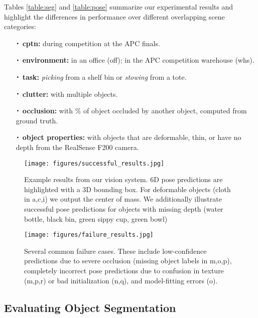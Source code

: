 \documentclass[letterpaper, 10 pt, conference]{ieeeconf}  %
\newcommand*{\Cdot}{\raisebox{-0.25ex}{\scalebox{1.75}{$\cdot$}}}
\begin{document}
Tables \ref{table:seg} and \ref{table:pose} summarize our experimental results and highlight the differences in performance over different overlapping scene categories:
\begin{itemize}
\item[$\Cdot$] \textbf{cptn:} during competition at the APC finals.
\item[$\Cdot$] \textbf{environment:} in an office (off); in the APC competition warehouse (whs).
\item[$\Cdot$] \textbf{task:} \textit{picking} from a shelf bin or \textit{stowing} from a tote.
\item[$\Cdot$] \textbf{clutter:} with multiple objects.
\item[$\Cdot$] \textbf{occlusion:} with \% of object occluded by another object, computed from ground truth.
\item[$\Cdot$] \textbf{object properties:} with objects that are deformable, thin, or have no depth from the RealSense F200 camera.
\end{itemize}

\begin{figure*}[t]
 \vspace{2mm}
\centering
  \texttt{[image: figures/successful\_results.jpg]}%
    \vspace{-2mm}
  \caption{Example results from our vision system. 6D pose predictions are highlighted with a 3D bounding box. For deformable objects (cloth in a,c,i) we output the center of mass. We additionally illustrate successful pose predictions for objects with missing depth (water bottle, black bin, green sippy cup, green bowl)}
  \label{fig:successful_results}

\vspace{2mm}
\centering
  \texttt{[image: figures/failure\_results.jpg]}%
  \vspace{-2mm}
  \caption{Several common failure cases. These include low-confidence predictions due to severe occlusion (missing object labels in m,o,p), completely incorrect pose predictions due to confusion in texture (m,p,r) or bad initialization (n,q), and model-fitting errors (o).}
  \label{fig:failure_results}
  \vspace{-5mm}
\end{figure*}



\subsection{Evaluating Object Segmentation}
\end{document}
